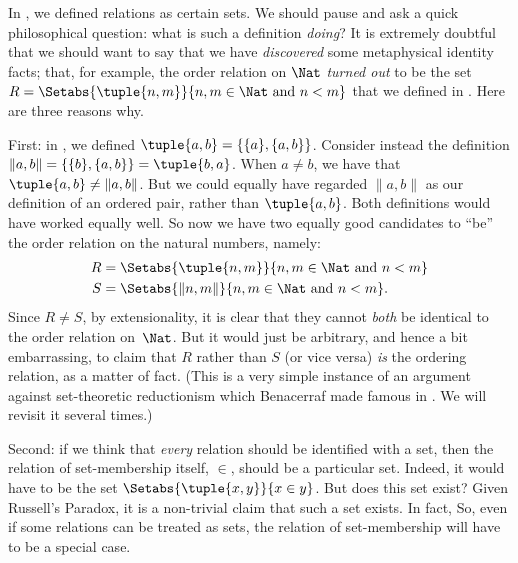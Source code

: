 \documentclass[../../../include/open-logic-section]{subfiles}
\begin{document}

In , we defined relations as certain sets. We should
pause and ask a quick philosophical question: what is such a
definition \emph{doing}? It is extremely doubtful that we should want
to say that we have \emph{discovered} some metaphysical identity
facts; that, for example, the order relation on $\Nat$ \emph{turned
out} to be the set $R=  \Setabs{\tuple{n,m}}{n, m \in \Nat\text{ and }
n < m}$ that we defined in . Here are three
reasons why. 

First: in , we defined $\tuple{a, b} =
\{\{a\}, \{a, b\}\}$. Consider instead the definition $\lVert a,
b\rVert = \{\{b\}, \{a, b\}\} = \tuple{b,a}$. When $a \neq b$, we have
that $\tuple{a, b} \neq \lVert a,b\rVert$. But we could equally have
regarded $\lVert a,b\rVert$ as our definition of an ordered pair,
rather than $\tuple{a,b}$. Both definitions would have worked equally
well. So now we have two equally good candidates to ``be'' the order
relation on the natural numbers, namely:
\begin{align*}
		R &= \Setabs{\tuple{n,m}}{n, m \in \Nat \text{ and }n < m}\\
		S &= \Setabs{\lVert n,m\rVert}{n, m \in \Nat \text{ and }n < m}.
\end{align*}
Since $R \neq S$, by extensionality, it is clear that they cannot
\emph{both} be identical to the order relation on~$\Nat$. But it would
just be arbitrary, and hence a bit embarrassing, to claim that $R$
rather than $S$ (or vice versa) \emph{is} the ordering relation, as a
matter of fact. (This is a very simple instance of an argument against
set-theoretic reductionism which Benacerraf made famous in
\cite{Benacerraf1965}. We will revisit it several times.)

Second: if we think that \emph{every} relation should be identified
with a set, then the relation of set-membership itself, $\in$, should
be a particular set. Indeed, it would have to be the set
$\Setabs{\tuple{x,y}}{x \in y}$. But does this set exist? Given
Russell's Paradox, it is a non-trivial claim that such a set exists.
In fact, 
So, even if some relations can be treated as sets, the relation of
set-membership will have to be a special case.
\end{document}
